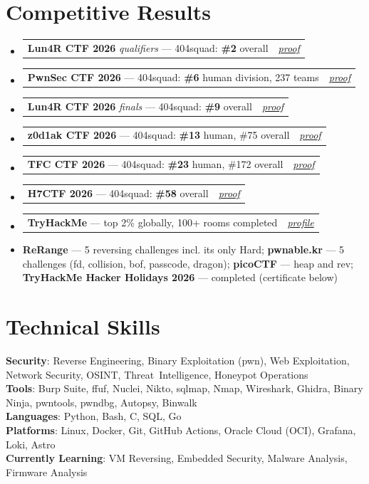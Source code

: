 \documentclass[letterpaper,11pt]{article}
\makeatletter
\newcommand{\resumeItem}[1]{
  \item\small{
    {#1\vspace{-2pt}}
  }
}
\newcommand{\resumeEntry}[2]{%
  \item
  \begin{tabular*}{\linewidth}{@{}l@{\extracolsep{\fill}}r@{}}
    #1 & \textit{\small #2} \\
  \end{tabular*}\vspace{-6pt}%
}
\newcommand{\resumeSubHeadingListStart}{\begin{itemize}[leftmargin=0.15in, label={}]}
\newcommand{\resumeSubHeadingListEnd}{\end{itemize}}
\makeatother
\begin{document}
\section{Competitive Results}
  \resumeSubHeadingListStart
    \resumeEntry{\textbf{Lun4R CTF 2026} \emph{qualifiers} --- 404squad: \textbf{\#2} overall}{\href{https://github.com/aaadarsh1337/cybersecurity-achievements/tree/main/Lun4R-quals}{proof}}
    \resumeEntry{\textbf{PwnSec CTF 2026} --- 404squad: \textbf{\#6} human division, 237 teams}{\href{https://github.com/aaadarsh1337/cybersecurity-achievements/tree/main/PwnSec}{proof}}
    \resumeEntry{\textbf{Lun4R CTF 2026} \emph{finals} --- 404squad: \textbf{\#9} overall}{\href{https://github.com/aaadarsh1337/cybersecurity-achievements/tree/main/Lun4R-finals}{proof}}
    \resumeEntry{\textbf{z0d1ak CTF 2026} --- 404squad: \textbf{\#13} human, \#75 overall}{\href{https://github.com/aaadarsh1337/cybersecurity-achievements/tree/main/z0d1ak-ctf}{proof}}
    \resumeEntry{\textbf{TFC CTF 2026} --- 404squad: \textbf{\#23} human, \#172 overall}{\href{https://github.com/aaadarsh1337/cybersecurity-achievements/tree/main/TFCCTF}{proof}}
    \resumeEntry{\textbf{H7CTF 2026} --- 404squad: \textbf{\#58} overall}{\href{https://github.com/aaadarsh1337/cybersecurity-achievements/tree/main/H7CTF}{proof}}
    \resumeEntry{\textbf{TryHackMe} --- top 2\% globally, 100+ rooms completed}{\href{https://tryhackme.com/p/aaadarsh1337}{profile}}
    \resumeItem{\textbf{ReRange} --- 5 reversing challenges incl. its only Hard; \textbf{pwnable.kr} --- 5 challenges (fd, collision, bof, passcode, dragon); \textbf{picoCTF} --- heap and rev; \textbf{TryHackMe Hacker Holidays 2026} --- completed (certificate below)}
  \resumeSubHeadingListEnd


\section{Technical Skills}
 \begin{itemize}[leftmargin=0.15in, label={}]
    \small{\item{
     \textbf{Security}{: Reverse Engineering, Binary Exploitation (pwn), Web Exploitation, Network Security, OSINT, Threat~Intelligence, Honeypot Operations} \\
     \textbf{Tools}{: Burp Suite, ffuf, Nuclei, Nikto, sqlmap, Nmap, Wireshark, Ghidra, Binary Ninja, pwntools, pwndbg, Autopsy, Binwalk} \\
     \textbf{Languages}{: Python, Bash, C, SQL, Go} \\
     \textbf{Platforms}{: Linux, Docker, Git, GitHub Actions, Oracle Cloud (OCI), Grafana, Loki, Astro} \\
     \textbf{Currently Learning}{: VM Reversing, Embedded Security, Malware Analysis, Firmware Analysis}
    }}
 \end{itemize}
\end{document}
